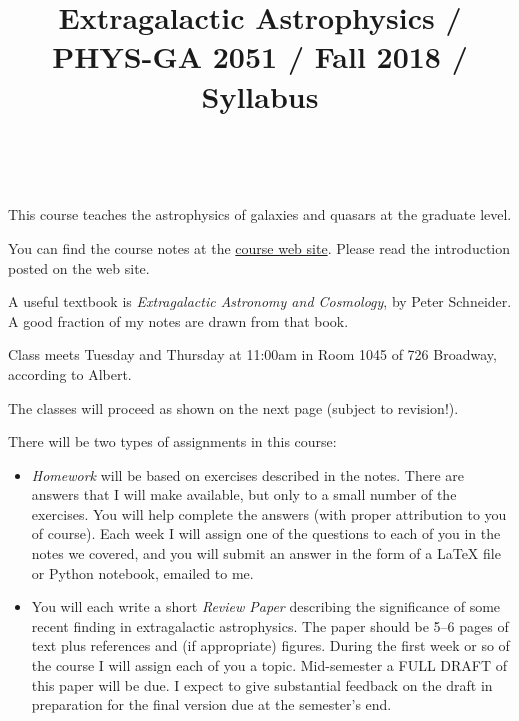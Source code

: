 \documentclass[11pt, preprint]{aastex}
\begin{document}
\title{\bf Extragalactic Astrophysics / PHYS-GA 2051 / Fall 2018 / Syllabus }

~

\noindent This course teaches the astrophysics of galaxies and quasars
at the graduate level.

\noindent You can find the course notes at the
\href{http://blanton144.github.io/exex}{course web site}. Please read
the introduction posted on the web site.

\noindent A useful textbook is {\it Extragalactic Astronomy and
  Cosmology}, by Peter Schneider. A good fraction of my notes are
drawn from that book.

\noindent Class meets Tuesday and Thursday at 11:00am in Room 1045 of
726 Broadway, according to Albert.

\noindent The classes will proceed as shown on the next page (subject
to revision!).

\noindent There will be two types of assignments in this course:

\begin{itemize}

\item {\it Homework} will be based on exercises described in the
  notes. There are answers that I will make available, but only to
  a small number of the exercises. You will help complete the answers
  (with proper attribution to you of course). Each week I will assign
  one of the questions to each of you in the notes we covered, and you
  will submit an answer in the form of a LaTeX file or Python
  notebook, emailed to me.

\item You will each write a short {\it Review Paper} describing the
  significance of some recent finding in extragalactic
  astrophysics. The paper should be 5--6 pages of text plus references
  and (if appropriate) figures. During the first week or so of the
  course I will assign each of you a topic. Mid-semester a FULL DRAFT
  of this paper will be due. I expect to give substantial feedback on
  the draft in preparation for the final version due at the semester's
  end.

\end{itemize}
\end{document}
